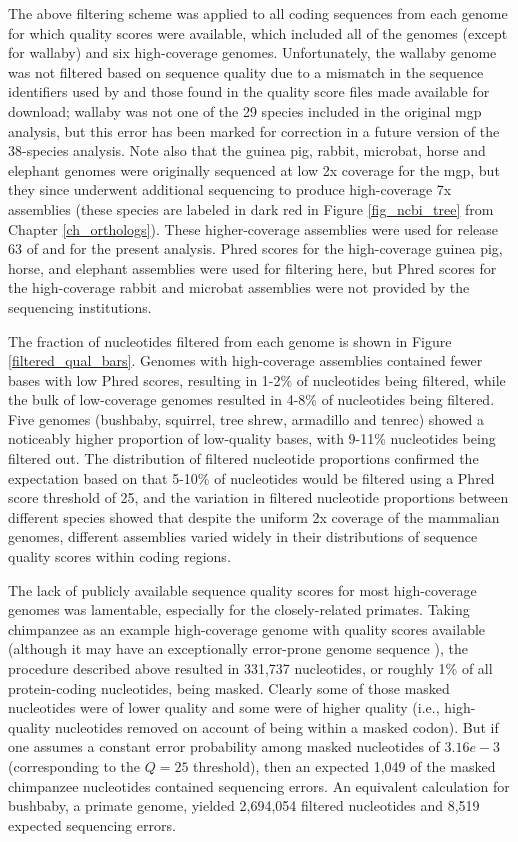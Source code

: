 The above filtering scheme was applied to all coding sequences from
each genome for which quality scores were available, which included
all of the \lcv genomes (except for wallaby) and six high-coverage
genomes. Unfortunately, the \lcv wallaby genome was not filtered based
on sequence quality due to a mismatch in the sequence identifiers used
by \ens and those found in the quality score files made available for
download; wallaby was not one of the 29 species included in the
original \ac{mgp} analysis, but this error has been marked for
correction in a future version of the 38-species analysis. Note also
that the guinea pig, rabbit, microbat, horse and elephant genomes were
originally sequenced at low 2x coverage for the \ac{mgp}, but they
since underwent additional sequencing to produce high-coverage 7x
assemblies (these species are labeled in dark red in Figure
\ref{fig_ncbi_tree} from Chapter \ref{ch_orthologs}). These
higher-coverage assemblies were used for release 63 of \ens and for
the present analysis. Phred scores for the high-coverage guinea pig,
horse, and elephant assemblies were used for filtering here, but Phred
scores for the high-coverage rabbit and microbat assemblies were not
provided by the sequencing institutions.

The fraction of nucleotides filtered from each genome is shown in
Figure \ref{filtered_qual_bars}. Genomes with high-coverage assemblies
contained fewer bases with low Phred scores, resulting in 1-2\% of
nucleotides being filtered, while the bulk of low-coverage genomes
resulted in 4-8\% of nucleotides being filtered.  Five genomes
(bushbaby, squirrel, tree shrew, armadillo and tenrec) showed a
noticeably higher proportion of low-quality bases, with 9-11\%
nucleotides being filtered out. The distribution of filtered
nucleotide proportions confirmed the expectation based on
\citet{Hubisz2011} that 5-10\% of nucleotides would be filtered using
a Phred score threshold of 25, and the variation in filtered
nucleotide proportions between different \lcv species showed that
despite the uniform 2x coverage of the \lcv mammalian genomes,
different assemblies varied widely in their distributions of sequence
quality scores within coding regions.

The lack of publicly available sequence quality scores for most
high-coverage genomes was lamentable, especially for the
closely-related primates. Taking chimpanzee as an example
high-coverage genome with quality scores available (although it may
have an exceptionally error-prone genome sequence
\citep{Mallick2009}), the procedure described above resulted in
331,737 nucleotides, or roughly 1\% of all protein-coding nucleotides,
being masked. Clearly some of those masked nucleotides were of lower
quality and some were of higher quality (i.e., high-quality
nucleotides removed on account of being within a masked codon). But if
one assumes a constant error probability among masked nucleotides of
$3.16e-3$ (corresponding to the $Q=25$ threshold), then an expected
1,049 of the masked chimpanzee nucleotides contained sequencing
errors. An equivalent calculation for bushbaby, a \lcv primate genome,
yielded 2,694,054 filtered nucleotides and 8,519 expected sequencing
errors.

